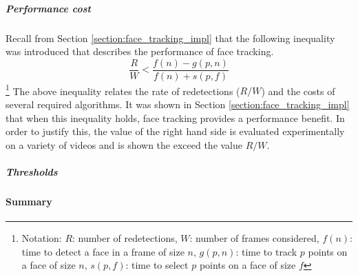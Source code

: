 \subparagraph{Performance cost}
Recall from Section \ref{section:face_tracking_impl} that the following inequality was introduced that describes the performance of face tracking.
\begin{equation*}
    \frac{R}{W} < \frac{f(n)-g(p,n)}{f(n)+s(p,f)}
\end{equation*}\footnote{Notation: $R$: number of redetections, $W$: number of frames considered, $f(n)$: time to detect a face in a frame of size $n$, $g(p,n)$: time to track $p$ points on a face of size $n$, $s(p,f)$: time to select $p$ points on a face of size $f$ }
The above inequality relates the rate of redetections ($R/W$) and the costs of several required algorithms. It was shown in Section \ref{section:face_tracking_impl} that when this inequality holds, face tracking provides a performance benefit.
In order to justify this, the value of the right hand side is evaluated experimentally on a variety of videos and is shown the exceed the value $R/W$.

\subparagraph{Thresholds}


\paragraph{Summary}



